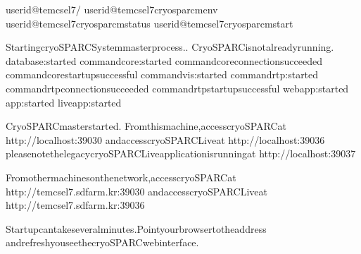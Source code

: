 \documentclass[a4paper,11pt,english]{sphinxmanual}
\begin{document}
\begin{sphinxVerbatim}[commandchars=\\\{\}]
userid@tem\PYGZhy{}cs\PYGZhy{}el7\PYGZdl{}\PYGZgt{}\PYGZti{}/
userid@tem\PYGZhy{}cs\PYGZhy{}el7\PYGZdl{}\PYGZgt{}cryosparcmenv
userid@tem\PYGZhy{}cs\PYGZhy{}el7\PYGZdl{}\PYGZgt{}cryosparcmstatus
userid@tem\PYGZhy{}cs\PYGZhy{}el7\PYGZdl{}\PYGZgt{}cryosparcmstart

StartingcryoSPARCSystemmasterprocess..
CryoSPARCisnotalreadyrunning.
database:started
command\PYGZus{}core:started
command\PYGZus{}coreconnectionsucceeded
command\PYGZus{}corestartupsuccessful
command\PYGZus{}vis:started
command\PYGZus{}rtp:started
command\PYGZus{}rtpconnectionsucceeded
command\PYGZus{}rtpstartupsuccessful
webapp:started
app:started
liveapp:started
\PYGZhy{}\PYGZhy{}\PYGZhy{}\PYGZhy{}\PYGZhy{}\PYGZhy{}\PYGZhy{}\PYGZhy{}\PYGZhy{}\PYGZhy{}\PYGZhy{}\PYGZhy{}\PYGZhy{}\PYGZhy{}\PYGZhy{}\PYGZhy{}\PYGZhy{}\PYGZhy{}\PYGZhy{}\PYGZhy{}\PYGZhy{}\PYGZhy{}\PYGZhy{}\PYGZhy{}\PYGZhy{}\PYGZhy{}\PYGZhy{}\PYGZhy{}\PYGZhy{}\PYGZhy{}\PYGZhy{}\PYGZhy{}\PYGZhy{}\PYGZhy{}\PYGZhy{}\PYGZhy{}\PYGZhy{}\PYGZhy{}\PYGZhy{}\PYGZhy{}\PYGZhy{}\PYGZhy{}\PYGZhy{}\PYGZhy{}\PYGZhy{}\PYGZhy{}\PYGZhy{}\PYGZhy{}\PYGZhy{}\PYGZhy{}\PYGZhy{}\PYGZhy{}\PYGZhy{}

CryoSPARCmasterstarted.
Fromthismachine,accesscryoSPARCat
http://localhost:39030
andaccesscryoSPARCLiveat
http://localhost:39036
pleasenotethelegacycryoSPARCLiveapplicationisrunningat
http://localhost:39037

Fromothermachinesonthenetwork,accesscryoSPARCat
http://tem\PYGZhy{}cs\PYGZhy{}el7.sdfarm.kr:39030
andaccesscryoSPARCLiveat
http://tem\PYGZhy{}cs\PYGZhy{}el7.sdfarm.kr:39036


Startupcantakeseveralminutes.Pointyourbrowsertotheaddress
andrefreshyouseethecryoSPARCwebinterface.
\end{sphinxVerbatim}
\end{document}
